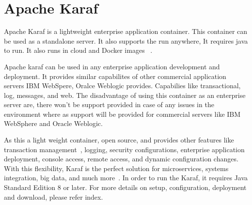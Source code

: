 \section{Apache Karaf}

Apache Karaf is a lightweight enterprise 
application container. This container can be used 
as a standalone server. It also supports
the run anywhere, It requires java to run.
It also runs in cloud and Docker
images ~\cite{hid-sp18-514-apachekaraf}.

Apache karaf can be used in any enterprise
application development and deployment. 
It provides similar capabilites of other 
commercial application servers IBM WebSpere, 
Oralce Weblogic provides. Capabilies like
transactional, log, messages, and web.
The disadvantage of using this container as
an enterprise server are, there won't be support
provided in case of any issues in the environment
where as support will be provided for commercial
servers like IBM WebSphere and Oracle Weblogic.

As this a light weight
container, open source, 
and provides other features like transaction
management~\cite{karaf_transaction},
logging, security configurations,
enterprise application deployment, 
console access, remote access, and
dynamic configuration changes.
With this flexibility, Karaf is the
perfect solution for microservices, 
systems integration, big data, and
much more~\cite{hid-sp18-514-apachekaraf}.  
In order to run the Karaf,
it requires Java Standard Edition 8 or later. 
For more details on setup,
configuration, deployment and download,
please refer index.